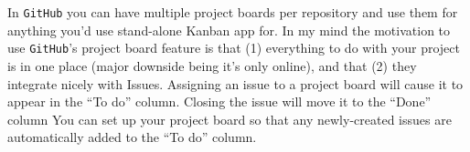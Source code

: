 \documentclass[12pt,letterpaper]{article}
\begin{document}
In \texttt{GitHub} you can have multiple project boards per repository and use them for anything you'd use stand-alone Kanban app for.
In my mind the motivation to use \texttt{GitHub}'s project board feature is that
(1) everything to do with your project is in one place (major downside being it's only online), and that
(2) they integrate nicely with Issues.
Assigning an issue to a project board will cause it to appear in the ``To do'' column.
Closing the issue will move it to the ``Done'' column
You can set up your project board so that any newly-created issues are automatically added to the ``To do'' column.
\end{document}
